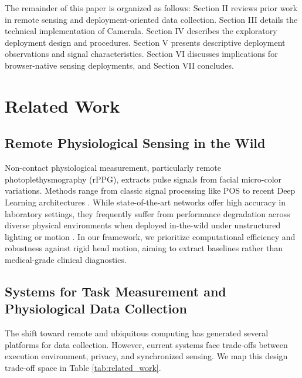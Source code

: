 \documentclass[dvipdfmx]{ehis}
\begin{document}
The remainder of this paper is organized as follows: Section II reviews prior work in remote sensing and deployment-oriented data collection. 
Section III details the technical implementation of Camerala. Section IV describes the exploratory deployment design and procedures. 
Section V presents descriptive deployment observations and signal characteristics. Section VI discusses implications for browser-native sensing deployments, and Section VII concludes.

\section{Related Work}

\subsection{Remote Physiological Sensing in the Wild}
Non-contact physiological measurement, particularly remote photoplethysmography (rPPG), extracts pulse signals from facial micro-color variations. Methods range from classic signal processing like POS \cite{wang_pos} to recent Deep Learning architectures \cite{deepphys}. While state-of-the-art networks offer high accuracy in laboratory settings, they frequently suffer from performance degradation across diverse physical environments when deployed in-the-wild under unstructured lighting or motion \cite{mcduff_rppg}. In our framework, we prioritize computational efficiency and robustness against rigid head motion, aiming to extract baselines rather than medical-grade clinical diagnostics.

\subsection{Systems for Task Measurement and Physiological Data Collection}
The shift toward remote and ubiquitous computing has generated several platforms for data collection. However, current systems face trade-offs between execution environment, privacy, and synchronized sensing. We map this design trade-off space in Table \ref{tab:related_work}.
\end{document}

